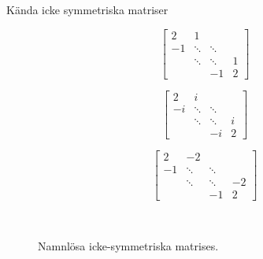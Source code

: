 \documentclass{beamer}
\begin{document}
\begin{frame}{Kända icke symmetriska matriser}
    \begin{figure}[H]
    \centering
    \begin{subfigure}{0.3\textwidth}
        \centering
        \[
        \begin{bmatrix}
        2 & 1 & & \\
        -1 & \ddots & \ddots & \\ 
        & \ddots & \ddots & 1 \\
        & & -1 & 2
    \end{bmatrix}
        \]
        \caption{}
    \end{subfigure}
    \begin{subfigure}{0.3\textwidth}
        \centering
        \[
     \begin{bmatrix}
        2 & i & & \\
        -i & \ddots & \ddots & \\
        & \ddots & \ddots & i \\
        & & -i & 2
        \end{bmatrix}
        \]
        \caption{}
        \end{subfigure}
        \begin{subfigure}{0.3\textwidth}
        \centering
        \[
        \begin{bmatrix}
            2 & -2 & & \\
            -1 & \ddots & \ddots & \\
            & \ddots & \ddots & -2 \\
            & & -1 & 2
        \end{bmatrix}
        \]
        \caption{}
    \end{subfigure}
    \\
    \caption{Namnlösa icke-symmetriska matrises.}
    \label{fig: Unnamed nonsym}
\end{figure}
\end{frame}
\end{document}
